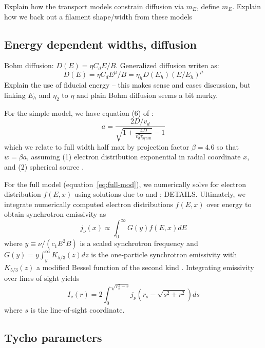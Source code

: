 \documentclass[iop, apj, numberedappendix, twocolappendix]{emulateapj}
\newcommand*{\mt}{\mathrm}
\begin{document}
Explain how the transport models constrain diffusion via $m_E$, define $m_E$.
Explain how we back out a filament shape/width from these models

\subsection{Energy dependent widths, diffusion}

Bohm diffusion: $D(E) = \eta C_d E / B$. Generalized diffusion writen as:
\[
    D(E) = \eta C_d E^\mu / B = \eta_h D(E_h) (E/E_h)^\mu
\]
Explain the use of fiducial energy -- this makes sense and eases discussion,
but linking $E_h$ and $\eta_2$ to $\eta$ and plain Bohm diffusion seems a bit
murky.

For the simple model, we have equation (6) of :
\begin{equation} \label{eq:simp-width}
    a = \frac{2 D / v_d}{ \sqrt{ 1 + \frac{4D}{v_d^2 \tau_{\mt{synch}}}} - 1}
\end{equation}
which we relate to full width half max by projection factor $\beta = 4.6$
so that $w = \beta a$, assuming (1) electron distribution exponential in radial
coordinate $x$, and (2) spherical source 
\citep{ballet2006}.

For the full model (equation~\eqref{eq:full-mod}), we numerically solve for
electron distribution $f(E,x)$ using solutions due to \citet{lerche1980} and
\citet{rettig2012}; DETAILS.
Ultimately, we integrate numerically computed electron distributions $f(E,x)$
over energy to obtain synchrotron emissivity as
\[
    j_{\nu}(x) \propto \int_0^\infty G(y) f(E,x) dE
\]
where $y \equiv \nu/(c_1 E^2 B)$ is a scaled synchrotron frequency and
$G(y) = y \int_y^\infty K_{5/3}(z) dz$ is the one-particle synchrotron
emissivity with $K_{5/3}(z)$ a modified Bessel function of the second kind
\citep{pacholczyk1970}.  Integrating emissivity over lines of sight yields
\begin{equation} \label{eq:intensity}
    I_{\nu}(r) = 2 \int_0^{\sqrt{r_s^2 - r}}
                    j_{\nu} \left( r_s - \sqrt{s^2 + r^2} \right) ds
\end{equation}
where $s$ is the line-of-sight coordinate.

\subsection{Tycho parameters}
\end{document}
